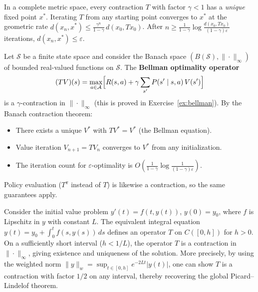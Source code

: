 \documentclass[11pt,a4paper]{article}
\begin{document}
\begin{keyresult}[title={Banach Contraction Mapping Theorem}]
In a complete metric space, every contraction $T$ with factor
$\gamma < 1$ has a \emph{unique} fixed point $x^*$.  Iterating $T$
from any starting point converges to $x^*$ at the geometric rate
$d(x_n, x^*) \leq \frac{\gamma^n}{1 - \gamma}\, d(x_0, Tx_0)$.
After $n \geq \frac{1}{1 - \gamma} \log \frac{d(x_0, Tx_0)}
{(1-\gamma)\varepsilon}$ iterations,
$d(x_n, x^*) \leq \varepsilon$.
\end{keyresult}

\begin{rlconnection}[title={Value Iteration as a Contraction}]
Let $\mathcal{S}$ be a finite state space and consider the Banach
space $(B(\mathcal{S}), \|\cdot\|_\infty)$ of bounded real-valued
functions on $\mathcal{S}$.  The \textbf{Bellman optimality operator}
\[
    (TV)(s) = \max_{a \in \mathcal{A}}
    \Bigl[ R(s,a) + \gamma \sum_{s'} P(s' \mid s, a)\, V(s') \Bigr]
\]
is a $\gamma$-contraction in $\|\cdot\|_\infty$ (this is proved in
Exercise~\ref{ex:bellman}).  By the Banach contraction theorem:
\begin{itemize}[nosep]
    \item There exists a unique $V^*$ with $TV^* = V^*$ (the Bellman
          equation).
    \item Value iteration $V_{n+1} = TV_n$ converges to $V^*$ from
          any initialization.
    \item The iteration count for $\varepsilon$-optimality is
          $O\!\left(\frac{1}{1-\gamma}
          \log \frac{1}{(1-\gamma)\varepsilon}\right)$.
\end{itemize}
Policy evaluation ($T^\pi$ instead of $T$) is likewise a contraction,
so the same guarantees apply.
\end{rlconnection}

\begin{example}
\label{ex:picard}
Consider the initial value problem $y'(t) = f(t, y(t))$, $y(0) = y_0$,
where $f$ is Lipschitz in $y$ with constant $L$.  The equivalent
integral equation $y(t) = y_0 + \int_0^t f(s, y(s))\, ds$ defines an
operator $T$ on $C([0, h])$ for $h > 0$.  On a sufficiently short
interval ($h < 1/L$), the operator $T$ is a contraction in
$\|\cdot\|_\infty$, giving existence and uniqueness of the solution.
More precisely, by using the weighted norm
$\|y\|_w = \sup_{t \in [0,h]} e^{-2Lt} |y(t)|$, one can show $T$ is
a contraction with factor $1/2$ on any interval, thereby recovering
the global Picard--Lindelof theorem.
\end{example}
\end{document}

